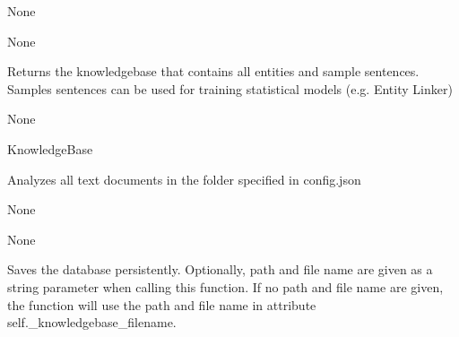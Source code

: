 \documentclass[letterpaper,10pt,english]{sphinxmanual}
\begin{document}
\begin{fulllineitems}
\begin{fulllineitems}
\sphinxAtStartPar
None

\sphinxAtStartPar
None

\end{fulllineitems}


\begin{fulllineitems}
\label{\detokenize{medextractor.knowledge_extractor:medextractor.knowledge_extractor.knowledge_extractor.KnowledgeExtractor.get_knowledge_base}}
\pysigstartsignatures
{}
\pysigstopsignatures
\sphinxAtStartPar
Returns the knowledgebase that contains all entities and
sample sentences. Samples sentences can be used for training
statistical models (e.g. Entity Linker)

\sphinxAtStartPar
None

\sphinxAtStartPar
KnowledgeBase

\end{fulllineitems}


\begin{fulllineitems}
\label{\detokenize{medextractor.knowledge_extractor:medextractor.knowledge_extractor.knowledge_extractor.KnowledgeExtractor.process_texts}}
\pysigstartsignatures
{}
\pysigstopsignatures
\sphinxAtStartPar
Analyzes all text documents in the folder specified in config.json

\sphinxAtStartPar
None

\sphinxAtStartPar
None

\end{fulllineitems}


\begin{fulllineitems}
\label{\detokenize{medextractor.knowledge_extractor:medextractor.knowledge_extractor.knowledge_extractor.KnowledgeExtractor.saveKB}}
\pysigstartsignatures
{}
\pysigstopsignatures
\sphinxAtStartPar
Saves the database persistently. Optionally, path and file name are given
as a string parameter when calling this function. If no path and file name
are given, the function will use the path and file name in attribute
self.\_knowledgebase\_filename.


\end{fulllineitems}
\end{fulllineitems}
\end{document}
